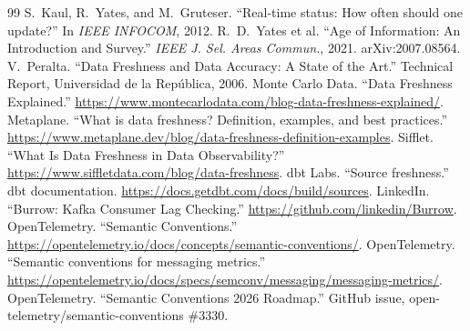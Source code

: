 \documentclass[11pt]{article}
\begin{document}
\begin{thebibliography}{99}
\footnotesize
{} S.~Kaul, R.~Yates, and M.~Gruteser. ``Real-time status: How
often should one update?'' In \emph{IEEE INFOCOM}, 2012.
 R.~D.~Yates et al. ``Age of Information: An
Introduction and Survey.'' \emph{IEEE J. Sel. Areas Commun.}, 2021.
arXiv:2007.08564.
 V.~Peralta. ``Data Freshness and Data Accuracy: A State
of the Art.'' Technical Report, Universidad de la Rep\'ublica, 2006.
 Monte Carlo Data. ``Data Freshness Explained.''
\url{https://www.montecarlodata.com/blog-data-freshness-explained/}.
 Metaplane. ``What is data freshness? Definition, examples,
and best practices.'' \url{https://www.metaplane.dev/blog/data-freshness-definition-examples}.
 Sifflet. ``What Is Data Freshness in Data Observability?''
\url{https://www.siffletdata.com/blog/data-freshness}.
 dbt Labs. ``Source freshness.'' dbt documentation.
\url{https://docs.getdbt.com/docs/build/sources}.
 LinkedIn. ``Burrow: Kafka Consumer Lag Checking.''
\url{https://github.com/linkedin/Burrow}.
 OpenTelemetry. ``Semantic Conventions.''
\url{https://opentelemetry.io/docs/concepts/semantic-conventions/}.
 OpenTelemetry. ``Semantic conventions for messaging
metrics.'' \url{https://opentelemetry.io/docs/specs/semconv/messaging/messaging-metrics/}.
 OpenTelemetry. ``Semantic Conventions 2026 Roadmap.''
GitHub issue, open-telemetry/semantic-conventions \#3330.
\end{thebibliography}
\end{document}
